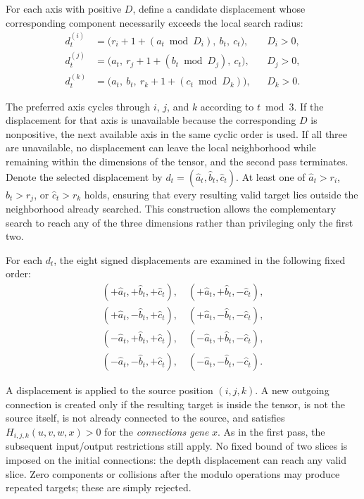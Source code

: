 \documentclass[12pt,a4paper]{article}
\begin{document}
\begin{enumerate}
	For each axis with positive $D$, define a candidate displacement whose corresponding component necessarily exceeds the local search radius:
	\begin{equation}
	\begin{aligned}
	 d_t^{(i)}&=\big(r_i+1+(a_t\bmod D_i),\ b_t,\ c_t\big), &&D_i>0,\\
	 d_t^{(j)}&=\big(a_t,\ r_j+1+(b_t\bmod D_j),\ c_t\big), &&D_j>0,\\
	 d_t^{(k)}&=\big(a_t,\ b_t,\ r_k+1+(c_t\bmod D_k)\big), &&D_k>0.
	\end{aligned}
	\label{additional_connection_shifted_offsets}
	\end{equation}

	The preferred axis cycles through $i$, $j$, and $k$ according to $t\bmod 3$. If the displacement for that axis is unavailable because the corresponding $D$ is nonpositive, the next available axis in the same cyclic order is used. If all three are unavailable, no displacement can leave the local neighborhood while remaining within the dimensions of the tensor, and the second pass terminates. Denote the selected displacement by $d_t=(\widehat a_t,\widehat b_t,\widehat c_t)$. At least one of $\widehat a_t>r_i$, $\widehat b_t>r_j$, or $\widehat c_t>r_k$ holds, ensuring that every resulting valid target lies outside the neighborhood already searched. This construction allows the complementary search to reach any of the three dimensions rather than privileging only the first two.

	For each $d_t$, the eight signed displacements are examined in the following fixed order:
	\begin{equation}
	\begin{gathered}
	(+\widehat a_t,+\widehat b_t,+\widehat c_t),\quad(+\widehat a_t,+\widehat b_t,-\widehat c_t),\\
	(+\widehat a_t,-\widehat b_t,+\widehat c_t),\quad(+\widehat a_t,-\widehat b_t,-\widehat c_t),\\
	(-\widehat a_t,+\widehat b_t,+\widehat c_t),\quad(-\widehat a_t,+\widehat b_t,-\widehat c_t),\\
	(-\widehat a_t,-\widehat b_t,+\widehat c_t),\quad(-\widehat a_t,-\widehat b_t,-\widehat c_t).
	\end{gathered}
	\label{additional_connection_signs}
	\end{equation}
	
	A displacement is applied to the source position $(i,j,k)$. A new outgoing connection is created only if the resulting target is inside the tensor, is not the source itself, is not already connected to the source, and satisfies $H_{i,j,k}(u,v,w,x)>0$ for the \emph{connections gene} $x$. As in the first pass, the subsequent input/output restrictions still apply. No fixed bound of two slices is imposed on the initial connections: the depth displacement can reach any valid slice. Zero components or collisions after the modulo operations may produce repeated targets; these are simply rejected.


\end{enumerate}
\end{document}
